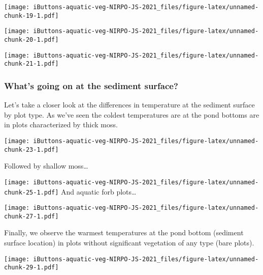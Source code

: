 \documentclass[
]{article}
\begin{document}
\texttt{[image: iButtons-aquatic-veg-NIRPO-JS-2021\_files/figure-latex/unnamed-chunk-19-1.pdf]}

\texttt{[image: iButtons-aquatic-veg-NIRPO-JS-2021\_files/figure-latex/unnamed-chunk-20-1.pdf]}

\texttt{[image: iButtons-aquatic-veg-NIRPO-JS-2021\_files/figure-latex/unnamed-chunk-21-1.pdf]}

\hypertarget{whats-going-on-at-the-sediment-surface}{%
\subsubsection{What's going on at the sediment
surface?}\label{whats-going-on-at-the-sediment-surface}}

Let's take a closer look at the differences in temperature at the
sediment surface by plot type. As we've seen the coldest temperatures
are at the pond bottoms are in plots characterized by thick moss.

\texttt{[image: iButtons-aquatic-veg-NIRPO-JS-2021\_files/figure-latex/unnamed-chunk-23-1.pdf]}

Followed by shallow moss\ldots{}

\texttt{[image: iButtons-aquatic-veg-NIRPO-JS-2021\_files/figure-latex/unnamed-chunk-25-1.pdf]}
And aquatic forb plots\ldots{}

\texttt{[image: iButtons-aquatic-veg-NIRPO-JS-2021\_files/figure-latex/unnamed-chunk-27-1.pdf]}

Finally, we observe the warmest temperatures at the pond bottom
(sediment surface location) in plots without significant vegetation of
any type (bare plots).

\texttt{[image: iButtons-aquatic-veg-NIRPO-JS-2021\_files/figure-latex/unnamed-chunk-29-1.pdf]}
\end{document}
